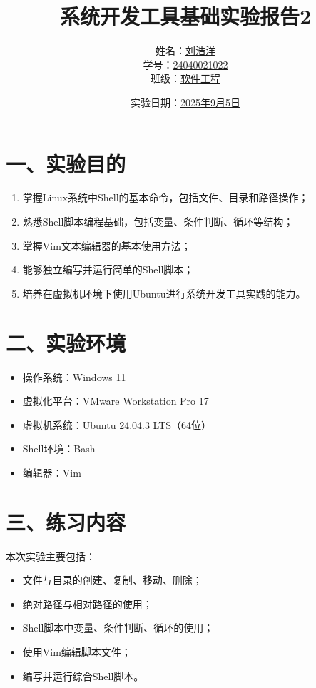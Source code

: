 \documentclass[a4paper, 12pt]{article}
\begin{document}
\title{\huge{系统开发工具基础实验报告2}}
\author{姓名：\underline{刘浩洋} \\ 
        学号：\underline{24040021022} \\ 
        班级：\underline{软件工程}}
\date{实验日期：\underline{2025年9月5日}}
\maketitle

\section*{一、实验目的}
\begin{enumerate}
    \item 掌握Linux系统中Shell的基本命令，包括文件、目录和路径操作；
    \item 熟悉Shell脚本编程基础，包括变量、条件判断、循环等结构；
    \item 掌握Vim文本编辑器的基本使用方法；
    \item 能够独立编写并运行简单的Shell脚本；
    \item 培养在虚拟机环境下使用Ubuntu进行系统开发工具实践的能力。
\end{enumerate}

\section*{二、实验环境}
\begin{itemize}
    \item 操作系统：Windows 11
    \item 虚拟化平台：VMware Workstation Pro 17
    \item 虚拟机系统：Ubuntu 24.04.3 LTS（64位）
    \item Shell环境：Bash
    \item 编辑器：Vim
\end{itemize}

\section*{三、练习内容}
本次实验主要包括：
\begin{itemize}
    \item 文件与目录的创建、复制、移动、删除；
    \item 绝对路径与相对路径的使用；
    \item Shell脚本中变量、条件判断、循环的使用；
    \item 使用Vim编辑脚本文件；
    \item 编写并运行综合Shell脚本。
\end{itemize}
\end{document}
